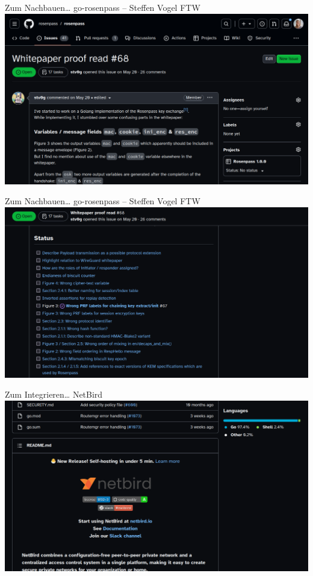 \documentclass{rosenpass-beamer}
\begin{document}
\begin{frame}{Zum Nachbauen… go-rosenpass – Steffen Vogel FTW}
  \includegraphics[height=.9\textheight]{assets/2023-09-02-steffen-proof-read.png}
\end{frame}

\begin{frame}{Zum Nachbauen… go-rosenpass – Steffen Vogel FTW}
  \includegraphics[height=.9\textheight]{assets/2023-09-02-steffen-proof-read-issues.png}
\end{frame}

\begin{frame}{Zum Integrieren… NetBird}
  \includegraphics[height=.9\textheight]{assets/2023-09-02-netbird-gh.png}
\end{frame}
\end{document}
